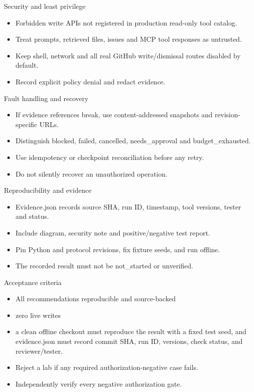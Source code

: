 \documentclass[aspectratio=169,10pt]{beamer}
\begin{document}
\begin{frame}{Security and least privilege}
\small
\begin{itemize}
\item Forbidden write APIs not registered in production read-only tool catalog.
\item Treat prompts, retrieved files, issues and MCP tool responses as untrusted.
\item Keep shell, network and all real GitHub write/dismissal routes disabled by default.
\item Record explicit policy denial and redact evidence.
\end{itemize}

\end{frame}

\begin{frame}{Fault handling and recovery}
\small
\begin{itemize}
\item If evidence references break, use content-addressed snapshots and revision-specific URLs.
\item Distinguish blocked, failed, cancelled, needs\_approval and budget\_exhausted.
\item Use idempotency or checkpoint reconciliation before any retry.
\item Do not silently recover an unauthorized operation.
\end{itemize}

\end{frame}

\begin{frame}{Reproducibility and evidence}
\small
\begin{itemize}
\item Evidence.json records source SHA, run ID, timestamp, tool versions, tester and status.
\item Include diagram, security note and positive/negative test report.
\item Pin Python and protocol revisions, fix fixture seeds, and run offline.
\item The recorded result must not be not\_started or unverified.
\end{itemize}

\end{frame}

\begin{frame}{Acceptance criteria}
\small
\begin{itemize}
\item All recommendations reproducible and source-backed
\item zero live writes
\item a clean offline checkout must reproduce the result with a fixed test seed, and evidence.json must record commit SHA, run ID, versions, check status, and reviewer/tester.
\item Reject a lab if any required authorization-negative case fails.
\item Independently verify every negative authorization gate.
\end{itemize}

\end{frame}
\end{document}
